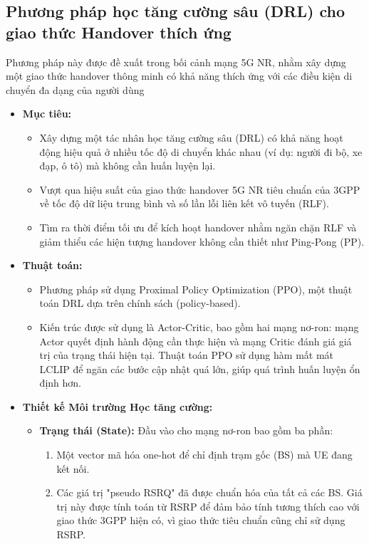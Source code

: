 \documentclass{article} %
\begin{document}
\subsection{Phương pháp học tăng cường sâu (DRL) cho giao thức Handover thích ứng}
Phương pháp này được đề xuất trong bối cảnh mạng 5G NR, nhằm xây dựng một giao thức handover thông minh có khả năng thích ứng với các điều kiện di chuyển đa dạng của người dùng \cite{gu2024deep}
\begin{itemize}
    \item \textbf{Mục tiêu:}
    \begin{itemize}
        \item Xây dựng một tác nhân học tăng cường sâu (DRL) có khả năng hoạt động hiệu quả ở nhiều tốc độ di chuyển khác nhau (ví dụ: người đi bộ, xe đạp, ô tô) mà không cần huấn luyện lại.
        \item Vượt qua hiệu suất của giao thức handover 5G NR tiêu chuẩn của 3GPP về tốc độ dữ liệu trung bình và số lần lỗi liên kết vô tuyến (RLF).
        \item Tìm ra thời điểm tối ưu để kích hoạt handover nhằm ngăn chặn RLF và giảm thiểu các hiện tượng handover không cần thiết như Ping-Pong (PP).
    \end{itemize}
    \item \textbf{Thuật toán:}
    \begin{itemize}
        \item Phương pháp sử dụng Proximal Policy Optimization (PPO), một thuật toán DRL dựa trên chính sách (policy-based).
        \item Kiến trúc được sử dụng là Actor-Critic, bao gồm hai mạng nơ-ron: mạng Actor quyết định hành động cần thực hiện và mạng Critic đánh giá giá trị của trạng thái hiện tại. Thuật toán PPO sử dụng hàm mất mát LCLIP để ngăn các bước cập nhật quá lớn, giúp quá trình huấn luyện ổn định hơn.
    \end{itemize}
    \item \textbf{Thiết kế Môi trường Học tăng cường:}
    \begin{itemize}
        \item \textbf{Trạng thái (State):} Đầu vào cho mạng nơ-ron bao gồm ba phần:
        \begin{enumerate}
            \item Một vector mã hóa one-hot để chỉ định trạm gốc (BS) mà UE đang kết nối.
            \item Các giá trị "pseudo RSRQ" đã được chuẩn hóa của tất cả các BS. Giá trị này được tính toán từ RSRP để đảm bảo tính tương thích cao với giao thức 3GPP hiện có, vì giao thức tiêu chuẩn cũng chỉ sử dụng RSRP.

\end{enumerate}
\end{itemize}
\end{itemize}
\end{document}
